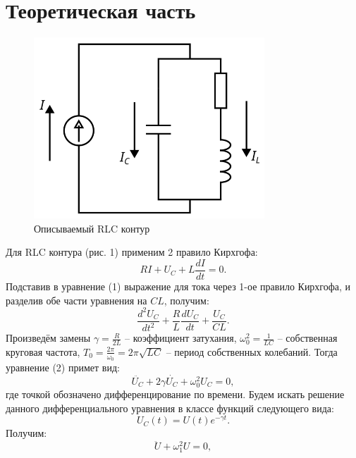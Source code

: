 \documentclass[a4paper,12pt]{extarticle}
\begin{document}
\newpage
\section{Теоретическая часть}
\begin{figure}
	\includegraphics[width=\linewidth]{shem.png}
	\caption{Описываемый RLC контур}
\end{figure}
\noindent Для RLC контура (рис. 1) применим 2 правило Кирхгофа:
\begin{equation}
    RI + U_C + L\frac{dI}{dt} = 0.
\end{equation}
Подставив в уравнение (1) выражение для тока через 1-ое правило Кирхгофа, и разделив обе части уравнения на $CL$, получим:
\begin{equation}
    \frac{d^2U_C}{dt^2} + \frac{R}{L} \frac{dU_C}{dt} + \frac{U_C}{CL}.
\end{equation}
Произведём замены $\gamma = \frac{R}{2L}$ -- коэффициент затухания, $\omega_0^2 = \frac{1}{LC}$ -- собственная круговая частота, $T_0 = \frac{2\pi}{\omega_0} = 2\pi \sqrt{LC}$ -- период собственных колебаний. Тогда уравнение (2) примет вид:
\begin{equation}
    \ddot{U_C} + 2 \gamma \dot{U_C} + \omega_0^2U_C = 0,
\end{equation}
где точкой обозначено дифференцирование по времени. Будем искать решение данного дифференциального уравнения в классе функций следующего вида:
$$U_C(t) = U(t)e^{- \gamma t}.$$
Получим:
\begin{equation}
    \ddot{U} + \omega_1^2 U = 0,
\end{equation}
\end{document}
